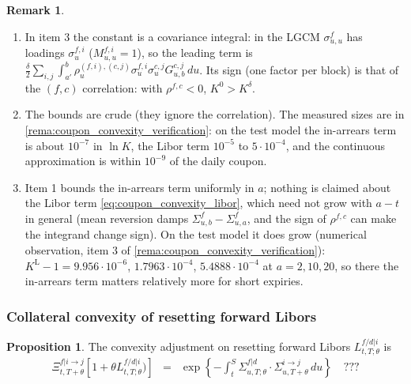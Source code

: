 \documentclass[11pt,english]{amsart}
\newcommand{\Q}{\Xi}
\theoremstyle{definition}
\newtheorem{prop}{Proposition}
\newtheorem{rema}{Remark}
\begin{document}
\begin{rema}
\begin{enumerate}
\item In item 3 the constant is a covariance integral: in the LGCM $\sigma^f_{u,u}$ has loadings $\sigma^{f,i}_u$ ($M^{f,i}_{u,u} = 1$), so the leading term is $\frac{\delta}{2}\sum_{i,j}\int_{a'}^b\rho^{(f,i),(c,j)}_u\sigma^{f,i}_u\sigma^{c,j}_uG^{c,j}_{u,b}\,du$. Its sign (one factor per block) is that of the $(f,c)$ correlation: with $\rho^{f,c}<0$, $K^0>K^\delta$.
\item The bounds are crude (they ignore the correlation). The measured sizes are in \autoref{rema:coupon_convexity_verification}: on the test model the in-arrears term is about $10^{-7}$ in $\ln K$, the Libor term $10^{-5}$ to $5\cdot10^{-4}$, and the continuous approximation is within $10^{-9}$ of the daily coupon.
\item Item 1 bounds the in-arrears term uniformly in $a$; nothing is claimed about the Libor term \eqref{eq:coupon_convexity_libor}, which need not grow with $a-t$ in general (mean reversion damps $\Sigma^f_{u,b}-\Sigma^f_{u,a}$, and the sign of $\rho^{f,c}$ can make the integrand change sign). On the test model it does grow (numerical observation, item 3 of \autoref{rema:coupon_convexity_verification}): $K^{\mathrm{L}}-1 = 9.956\cdot10^{-6}$, $1.7963\cdot10^{-4}$, $5.4888\cdot10^{-4}$ at $a = 2, 10, 20$, so there the in-arrears term matters relatively more for short expiries.
\end{enumerate}
\end{rema}





 
\subsubsection{Collateral convexity of resetting forward Libors}%


\begin{prop}
The convexity adjustment on resetting forward Libors $L^{f/d|i}_{t,T;\theta}$ is
\begin{eqnarray}
   \Q_{t,T+\theta}^{f | i\to j}\left[ 1 + \theta L^{f/d|i}_{t,T;\theta}) \right] 
   &=&  \exp\left\{  - \int_t^S \Sigma^{f|d}_{u,T;\theta}  \cdot  \Sigma^{i\to j}_{u,T+\theta}\, du \right\}  \quad ???\end{eqnarray} 

\end{prop}
\end{document}
